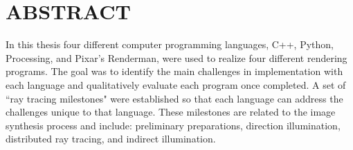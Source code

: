 %
%
%

\chapter*{ABSTRACT}

\pagestyle{plain} %
\setcounter{page}{2}

\indent In this thesis four different computer programming languages, C++, Python, Processing, and Pixar's Renderman, were used to realize four different rendering programs.  The goal was to identify the main challenges in implementation with each language and qualitatively evaluate each program once completed.  A set of ``ray tracing milestones" were established so that each language can address the challenges unique to that language.  These milestones are related to the image synthesis process and include: preliminary preparations, direction illumination, distributed ray tracing, and indirect illumination.



\pagebreak{} 